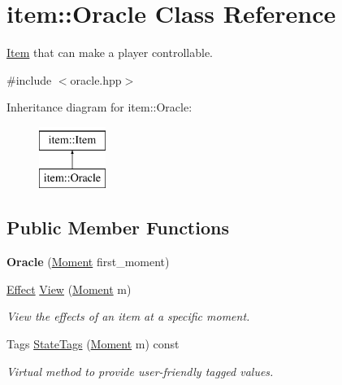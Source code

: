 \hypertarget{classitem_1_1_oracle}{}\section{item\+:\+:Oracle Class Reference}
\label{classitem_1_1_oracle}


\hyperlink{classitem_1_1_item}{Item} that can make a player controllable.  




{\ttfamily \#include $<$oracle.\+hpp$>$}

Inheritance diagram for item\+:\+:Oracle\+:\begin{figure}[H]
\begin{center}
\leavevmode
\includegraphics[height=2.000000cm]{classitem_1_1_oracle}
\end{center}
\end{figure}
\subsection*{Public Member Functions}
\begin{DoxyCompactItemize}
\item 
\mbox{\label{classitem_1_1_oracle_aef8394c1370b0cf661b84ea454cff536}} 
{\bfseries Oracle} (\hyperlink{classtimeplane_1_1_moment}{Moment} first\+\_\+moment)
\item 
\hyperlink{classitem_1_1_effect}{Effect} \hyperlink{classitem_1_1_oracle_a9982f1934a769cc461246bab31b8a72d}{View} (\hyperlink{classtimeplane_1_1_moment}{Moment} m)
\begin{DoxyCompactList}\small\item\em View the effects of an item at a specific moment. \end{DoxyCompactList}\item 
Tags \hyperlink{classitem_1_1_oracle_a61b1924335a4c4443a78ee75f9935b14}{State\+Tags} (\hyperlink{classtimeplane_1_1_moment}{Moment} m) const
\begin{DoxyCompactList}\small\item\em Virtual method to provide user-\/friendly tagged values. \end{DoxyCompactList}\end{DoxyCompactItemize}
